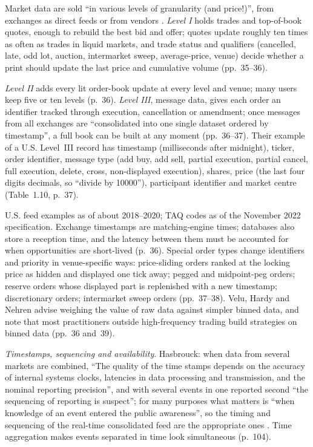 \begin{qfdata}\label{data:market-data-levels}
 Market data are sold ``in various levels of granularity (and price!)'', from exchanges as direct feeds or from vendors \citep[chap.~1, sec.~1.4.2, p.~35]{s3-velu}. \emph{Level I} holds trades and top-of-book quotes, enough to rebuild the best bid and offer; quotes update roughly ten times as often as trades in liquid markets, and trade status and qualifiers (cancelled, late, odd lot, auction, intermarket sweep, average-price, venue) decide whether a print should update the last price and cumulative volume (pp.~35--36).

\emph{Level II} adds every lit order-book update at every level and venue; many users keep five or ten levels (p.~36). \emph{Level III}, message data, gives each order an identifier tracked through execution, cancellation or amendment; once messages from all exchanges are ``consolidated into one single dataset ordered by timestamp'', a full book can be built at any moment (pp.~36--37). Their example of a U.S. Level~III record has timestamp (milliseconds after midnight), ticker, order identifier, message type (add buy, add sell, partial execution, partial cancel, full execution, delete, cross, non-displayed execution), shares, price (the last four digits decimals, so ``divide by 10000''), participant identifier and market centre (Table~1.10, p.~37).

 U.S. feed examples as of about 2018--2020; TAQ codes as of the November 2022 specification. Exchange timestamps are matching-engine times; databases also store a reception time, and the latency between them must be accounted for when opportunities are short-lived (p.~36). Special order types change identifiers and priority in venue-specific ways: price-sliding orders ranked at the locking price as hidden and displayed one tick away; pegged and midpoint-peg orders; reserve orders whose displayed part is replenished with a new timestamp; discretionary orders; intermarket sweep orders (pp.~37--38). Velu, Hardy and Nehren advise weighing the value of raw data against simpler binned data, and note that most practitioners outside high-frequency trading build strategies on binned data (pp.~36 and~39).

\emph{Timestamps, sequencing and availability}. Hasbrouck: when data from several markets are combined, ``The quality of the time stamps depends on the accuracy of internal systems clocks, latencies in data processing and transmission, and the nominal reporting precision'', and with several events in one reported second ``the sequencing of reporting is suspect''; for many purposes what matters is ``when knowledge of an event entered the public awareness'', so the timing and sequencing of the real-time consolidated feed are the appropriate ones \citep[chap.~10, p.~105]{s6-hasbrouck}. Time aggregation makes events separated in time look simultaneous (p.~104).


\end{qfdata}
